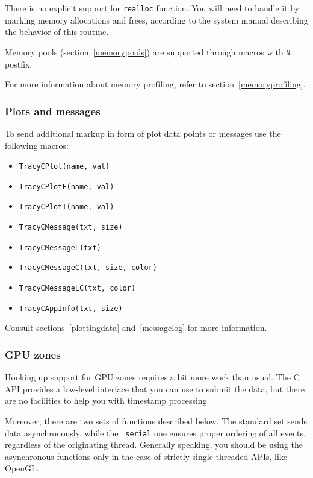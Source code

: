 \documentclass[hidelinks,titlepage,a4paper]{article}
\begin{document}
There is no explicit support for \texttt{realloc} function. You will need to handle it by marking memory allocations and frees, according to the system manual describing the behavior of this routine.

Memory pools (section~\ref{memorypools}) are supported through macros with \texttt{N} postfix.

For more information about memory profiling, refer to section~\ref{memoryprofiling}.

\subsubsection{Plots and messages}

To send additional markup in form of plot data points or messages use the following macros:

\begin{itemize}
\item \texttt{TracyCPlot(name, val)}
\item \texttt{TracyCPlotF(name, val)}
\item \texttt{TracyCPlotI(name, val)}
\item \texttt{TracyCMessage(txt, size)}
\item \texttt{TracyCMessageL(txt)}
\item \texttt{TracyCMessageC(txt, size, color)}
\item \texttt{TracyCMessageLC(txt, color)}
\item \texttt{TracyCAppInfo(txt, size)}
\end{itemize}

Consult sections~\ref{plottingdata} and~\ref{messagelog} for more information.

\subsubsection{GPU zones}

Hooking up support for GPU zones requires a bit more work than usual. The C API provides a low-level interface that you can use to submit the data, but there are no facilities to help you with timestamp processing.

Moreover, there are two sets of functions described below. The standard set sends data asynchronously, while the \texttt{\_serial} one ensures proper ordering of all events, regardless of the originating thread. Generally speaking, you should be using the asynchronous functions only in the case of strictly single-threaded APIs, like OpenGL.
\end{document}
